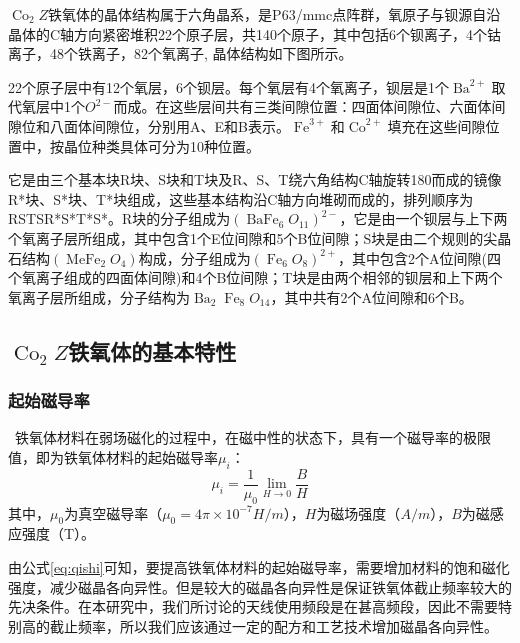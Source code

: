 \documentclass{article}
\newcommand{\tmop}[1]{\ensuremath{\operatorname{#1}}}
\begin{document}
\begin{center}
  $\tmop{Co}_2
  Z$铁氧体的晶体结构属于六角晶系，是P63/mmc点阵群，氧原子与钡源自沿晶体的C轴方向紧密堆积22个原子层，共140个原子，其中包括6个钡离子，4个钴离子，48个铁离子，82个氧离子,
  晶体结构如下图所示。
\end{center}

\resizebox{30em}{!}{\texttt{[image: ]}}

22个原子层中有12个氧层，6个钡层。每个氧层有4个氧离子，钡层是1个$\tmop{Ba}^{2
+}$取代氧层中1个$O^{2
-}$而成。在这些层间共有三类间隙位置：四面体间隙位、六面体间隙位和八面体间隙位，分别用A、E和B表示。$\tmop{Fe}^{3
+}$和$\tmop{Co}^{2
+}$填充在这些间隙位置中，按晶位种类具体可分为10种位置。

它是由三个基本块R块、S块和T块及R、S、T绕六角结构C轴旋转180而成的镜像R*块、S*块、T*块组成，这些基本结构沿C轴方向堆砌而成的，排列顺序为RSTSR*S*T*S*。R块的分子组成为$\left(
\tmop{BaFe}_6 O_{11} \right)^{2
-}$，它是由一个钡层与上下两个氧离子层所组成，其中包含1个E位间隙和5个B位间隙；S块是由二个规则的尖晶石结构$\left(
\tmop{MeFe}_2 O_4 \right)$构成，分子组成为$\left( \tmop{Fe}_6 O_8
\right)^{2
+}$，其中包含2个A位间隙(四个氧离子组成的四面体间隙)和4个B位间隙；T块是由两个相邻的钡层和上下两个氧离子层所组成，分子结构为$\tmop{Ba}_2
\tmop{Fe}_8 O_{14}$，其中共有2个A位间隙和6个B。

\subsection{$\tmop{Co}_2 Z$铁氧体的基本特性}

\subsubsection{起始磁导率}

\
铁氧体材料在弱场磁化的过程中，在磁中性的状态下，具有一个磁导率的极限值，即为铁氧体材料的起始磁导率$\mu_i$：
\begin{equation}
  \label{eq:qishi} \mu_i = \frac{1}{\mu_0} \underset{H \rightarrow 0}{\lim}
  \frac{B}{H}
\end{equation}
其中，$\mu_0$为真空磁导率（$\mu_0 = 4 \pi \times 10^{- 7} H /
m$），$H$为磁场强度（$A / m$），$B$为磁感应强度（T）。

由公式\ref{eq:qishi}可知，要提高铁氧体材料的起始磁导率，需要增加材料的饱和磁化强度，减少磁晶各向异性。但是较大的磁晶各向异性是保证铁氧体截止频率较大的先决条件。在本研究中，我们所讨论的天线使用频段是在甚高频段，因此不需要特别高的截止频率，所以我们应该通过一定的配方和工艺技术增加磁晶各向异性。
\end{document}

